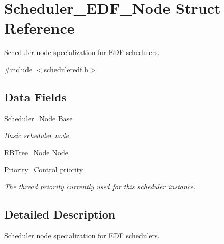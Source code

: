 \hypertarget{structScheduler__EDF__Node}{}\section{Scheduler\+\_\+\+E\+D\+F\+\_\+\+Node Struct Reference}
\label{structScheduler__EDF__Node}


Scheduler node specialization for E\+DF schedulers.  




{\ttfamily \#include $<$scheduleredf.\+h$>$}

\subsection*{Data Fields}
\begin{DoxyCompactItemize}
\item 
\mbox{\label{structScheduler__EDF__Node_ae691ef16beb2c56fc6a762f0a3cff18e}} 
\mbox{\hyperlink{structScheduler__Node}{Scheduler\+\_\+\+Node}} \mbox{\hyperlink{structScheduler__EDF__Node_ae691ef16beb2c56fc6a762f0a3cff18e}{Base}}
\begin{DoxyCompactList}\small\item\em Basic scheduler node. \end{DoxyCompactList}\item 
\mbox{\hyperlink{structRBTree__Node}{R\+B\+Tree\+\_\+\+Node}} \mbox{\hyperlink{structScheduler__EDF__Node_acbdb5103aad0be2385bbfc89b7d730b3}{Node}}
\item 
\mbox{\label{structScheduler__EDF__Node_aa1d16eb0e63f14a9b286ed45e35cb054}} 
\mbox{\hyperlink{group__RTEMSScorePriority_ga59d02b58072d31a9a1cfe644557aefe2}{Priority\+\_\+\+Control}} \mbox{\hyperlink{structScheduler__EDF__Node_aa1d16eb0e63f14a9b286ed45e35cb054}{priority}}
\begin{DoxyCompactList}\small\item\em The thread priority currently used for this scheduler instance. \end{DoxyCompactList}\end{DoxyCompactItemize}


\subsection{Detailed Description}
Scheduler node specialization for E\+DF schedulers. 

